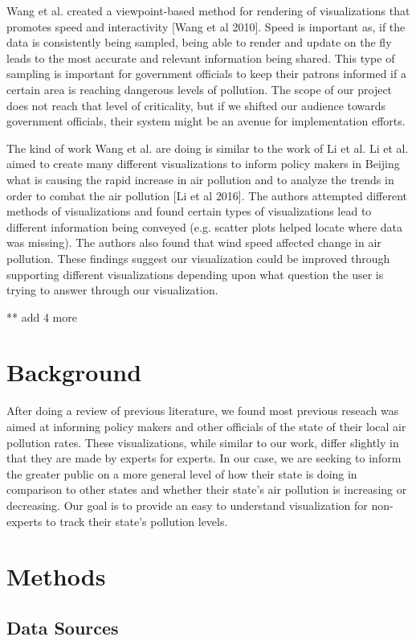 \documentclass[journal]{vgtc}                %
\begin{document}
Wang et al. created a viewpoint-based method for rendering of visualizations that promotes speed and interactivity [Wang 
et al 2010]. Speed is important as, if the data is consistently being sampled, being able to render and update on the 
fly leads to the most accurate and relevant information being shared. This type of sampling is important for government
officials to keep their patrons informed if a certain area is reaching dangerous levels of pollution. The scope of our
project does not reach that level of criticality, but if we shifted our audience towards government officials, their
system might be an avenue for implementation efforts.

The kind of work Wang et al. are doing is similar to the work of Li et al. Li et al. aimed to create many different
visualizations to inform policy makers in Beijing what is causing the rapid increase in air pollution and to analyze
the trends in order to combat the air pollution [Li et al 2016]. The authors attempted different methods of 
visualizations and found certain types of visualizations lead to different information being conveyed (e.g. scatter
plots helped locate where data was missing). The authors also found that wind speed affected change in air pollution.
These findings suggest our visualization could be improved through supporting different visualizations depending
upon what question the user is trying to answer through our visualization.

** add 4 more

\section{Background}
After doing a review of previous literature, we found most previous reseach was aimed at informing policy makers
and other officials of the state of their local air pollution rates. These visualizations, while similar to our work,
differ slightly in that they are made by experts for experts. In our case, we are seeking to inform the greater public
on a more general level of how their state is doing in comparison to other states and whether their state's air pollution
is increasing or decreasing. Our goal is to provide an easy to understand visualization for non-experts to track their
state's pollution levels.

\section{Methods}
\subsection{Data Sources}
\end{document}
